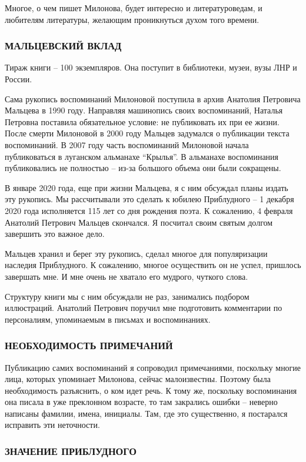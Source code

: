Многое, о чем пишет Милонова, будет интересно и литературоведам, и любителям
литературы, желающим проникнуться духом того времени.

\subsubsection{МАЛЬЦЕВСКИЙ ВКЛАД}

Тираж книги – 100 экземпляров. Она поступит в библиотеки, музеи, вузы ЛНР и
России.

Сама рукопись воспоминаний Милоновой поступила в архив Анатолия Петровича
Мальцева в 1990 году. Направляя машинопись своих воспоминаний, Наталья Петровна
поставила обязательное условие: не публиковать их при ее жизни. После смерти
Милоновой в 2000 году Мальцев задумался о публикации текста воспоминаний. В
2007 году часть воспоминаний Милоновой начала публиковаться в луганском
альманахе \enquote{Крылья}. В альманахе воспоминания публиковались не полностью – из-за
большого объема они были сокращены.

В январе 2020 года, еще при жизни Мальцева, я с ним обсуждал планы издать эту
рукопись. Мы рассчитывали это сделать к юбилею Приблудного – 1 декабря 2020
года исполняется 115 лет со дня рождения поэта. К сожалению, 4 февраля Анатолий
Петрович Мальцев скончался. Я посчитал своим святым долгом завершить это важное
дело.

Мальцев хранил и берег эту рукопись, сделал многое для популяризации наследия
Приблудного. К сожалению, многое осуществить он не успел, пришлось завершать
мне. И мне очень не хватало его мудрого, чуткого слова.

Структуру книги мы с ним обсуждали не раз, занимались подбором иллюстраций.
Анатолий Петрович поручил мне подготовить комментарии по персоналиям,
упоминаемым в письмах и воспоминаниях.

\subsubsection{НЕОБХОДИМОСТЬ ПРИМЕЧАНИЙ}

Публикацию самих воспоминаний я сопроводил примечаниями, поскольку многие лица,
которых упоминает Милонова, сейчас малоизвестны. Поэтому была необходимость
разъяснить, о ком идет речь. К тому же, поскольку воспоминания она писала в уже
преклонном возрасте, то там закрались ошибки – неверно написаны фамилии, имена,
инициалы. Там, где это существенно, я постарался исправить эти неточности.

\subsubsection{ЗНАЧЕНИЕ ПРИБЛУДНОГО}

